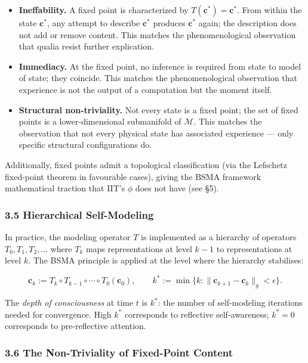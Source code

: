 \documentclass[
  11pt,
  a4paper,
]{article}
\providecommand{\tightlist}{%
  \setlength{\itemsep}{0pt}\setlength{\parskip}{0pt}}
\begin{document}
\begin{itemize}
\tightlist
\item
  \textbf{Ineffability.} A fixed point is characterized by
  \(T(\mathbf{c}^*) = \mathbf{c}^*\). From within the state
  \(\mathbf{c}^*\), any attempt to describe \(\mathbf{c}^*\) produces
  \(\mathbf{c}^*\) again; the description does not add or remove
  content. This matches the phenomenological observation that qualia
  resist further explication.
\item
  \textbf{Immediacy.} At the fixed point, no inference is required from
  state to model of state; they coincide. This matches the
  phenomenological observation that experience is not the output of a
  computation but the moment itself.
\item
  \textbf{Structural non-triviality.} Not every state is a fixed point;
  the set of fixed points is a lower-dimensional submanifold of
  \(\mathcal{M}\). This matches the observation that not every physical
  state has associated experience --- only specific structural
  configurations do.
\end{itemize}

Additionally, fixed points admit a topological classification (via the
Lefschetz fixed-point theorem in favourable cases), giving the BSMA
framework mathematical traction that IIT's \(\phi\) does not have (see
§5).

\subsubsection{3.5 Hierarchical
Self-Modeling}\label{hierarchical-self-modeling}

In practice, the modeling operator \(T\) is implemented as a hierarchy
of operators \(T_0, T_1, T_2, \ldots\) where \(T_k\) maps
representations at level \(k-1\) to representations at level \(k\). The
BSMA principle is applied at the level where the hierarchy stabilises:

\[
\mathbf{c}_k := T_k \circ T_{k-1} \circ \cdots \circ T_0 (\mathbf{c}_0), \qquad k^* := \min\{k : \|\mathbf{c}_{k+1} - \mathbf{c}_k\|_g < \epsilon\}.
\]

The \emph{depth of consciousness} at time \(t\) is \(k^*\): the number
of self-modeling iterations needed for convergence. High \(k^*\)
corresponds to reflective self-awareness; \(k^* = 0\) corresponds to
pre-reflective attention.

\subsubsection{3.6 The Non-Triviality of Fixed-Point
Content}\label{the-non-triviality-of-fixed-point-content}
\end{document}
